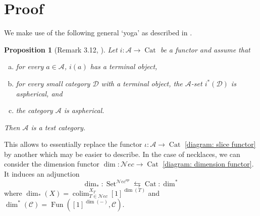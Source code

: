 \documentclass[12pt,a4paper,reqno]{amsart}
\DeclareMathOperator{\id}{id}
\DeclareMathOperator{\Fun}{Fun}
\DeclareMathOperator*{\colim}{colim}
\DeclareMathOperator{\Set}{Set}
\DeclareMathOperator{\Cat}{Cat}
\newcommand{\nec}{\mathcal{N}ec} %
\newtheorem{Lem}[Thm]{Lemma}
\newtheorem{Prop}[Thm]{Proposition}
\theoremstyle{definition}
\theoremstyle{remark}
\begin{document}
\section{Proof}

We make use of the following general `yoga' as described in \cite{jardine2006categorical}.

\begin{Prop}[Remark 3.12, \cite{jardine2006categorical}]\label{proposition: amenable functor}
Let $i: \mathcal{A}\to \Cat$ be a functor and assume that
\begin{enumerate}[(a)]
\item for every $a\in \mathcal{A}$, $i(a)$ has a terminal object,
\item for every small category $\mathcal{D}$ with a terminal object, the $\mathcal{A}$-set $i^{*}(\mathcal{D})$ is aspherical, and
\item the category $\mathcal{A}$ is aspherical. 
\end{enumerate}
Then $\mathcal{A}$ is a test category.
\end{Prop}

This allows to essentially replace the functor $\iota: \mathcal{A}\to \Cat$ \eqref{diagram: slice functor} by another which may be easier to describe. In the case of necklaces, we can consider the dimension functor $\dim: \nec\to \Cat$ \eqref{diagram: dimension functor}. It induces an adjunction
$$
\dim_{*}: \Set^{\nec^{op}}\leftrightarrows \Cat: \dim^{*}
$$
where $\dim_{*}(X) = \colim_{T\in \nec}^{X_{T}}[1]^{\dim(T)}$ and $\dim^{*}(\mathcal{C}) = \Fun([1]^{\dim(-)},\mathcal{C})$.

%
\end{document}
